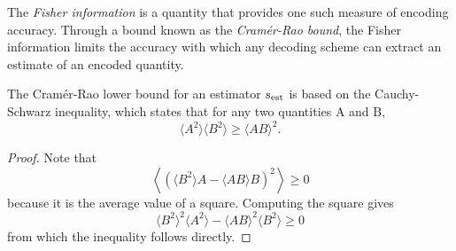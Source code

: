\begin{defn}
  The \emph{Fisher
information} is a quantity that provides one such measure of encoding
accuracy. Through a bound known as the \emph{Cramér-Rao bound}, the Fisher
information limits the accuracy with which any decoding scheme can extract an estimate of an encoded quantity.
\end{defn}
\begin{prop}
  The Cramér-Rao lower bound for an estimator $s_{\rm{est}}$ is based on the Cauchy-
  Schwarz inequality, which states that for any two quantities A and B,
  \begin{equation}
    \label{eq:3.67}
    \langle A^2\rangle \langle B^2\rangle\geq\langle AB\rangle^2.
    \end{equation}

\begin{proof}
 Note that
\begin{equation}
  \left\langle\left(\langle B^2\rangle A-\langle
AB\rangle B\right)^2\right\rangle\geq0
\label{eq:3.68}
\end{equation}
because it is the average value of a square. Computing the square
gives
\begin{equation}
\langle B^2\rangle^2\langle A^2\rangle-\langle AB\rangle^2\langle B^2\rangle\geq0
\label{eq:3.69}
\end{equation}
from which the inequality follows directly.
\end{proof}
\end{prop}

